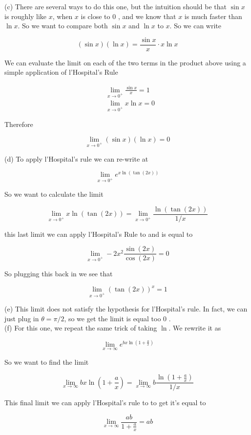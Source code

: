 \documentclass[10pt]{article}
\begin{document}
(c) There are several ways to do this one, but the intuition should be that $\sin x$ is roughly like $x$, when $x$ is close to 0 , and we know that $x$ is much faster than $\ln x$. So we want to compare both $\sin x$ and $\ln x$ to $x$. So we can write

$$
(\sin x)(\ln x)=\frac{\sin x}{x} \cdot x \ln x
$$

We can evaluate the limit on each of the two terms in the product above using a simple application of l'Hospital's Rule

$$
\begin{aligned}
& \lim _{x \rightarrow 0^{+}} \frac{\sin x}{x}=1 \\
& \lim _{x \rightarrow 0^{+}} x \ln x=0
\end{aligned}
$$

Therefore

$$
\lim _{x \rightarrow 0^{+}}(\sin x)(\ln x)=0
$$

(d) To apply l'Hospital's rule we can re-write at

$$
\lim _{x \rightarrow 0^{+}} e^{x \ln (\tan (2 x))}
$$

So we want to calculate the limit

$$
\lim _{x \rightarrow 0^{+}} x \ln (\tan (2 x))=\lim _{x \rightarrow 0^{+}} \frac{\ln (\tan (2 x))}{1 / x}
$$

this last limit we can apply l'Hospital's Rule to and is equal to

$$
\lim _{x \rightarrow 0^{+}}-2 x^{2} \frac{\sin (2 x)}{\cos (2 x)}=0
$$

So plugging this back in we see that

$$
\lim _{x \rightarrow 0^{+}}(\tan (2 x))^{x}=1
$$

(e) This limit does not satisfy the hypothesis for l'Hospital's rule. In fact, we can just plug in $\theta=\pi / 2$, so we get the limit is equal too 0 .\\
(f) For this one, we repeat the same trick of taking $\ln$. We rewrite it as

$$
\lim _{x \rightarrow \infty} e^{b x \ln \left(1+\frac{a}{x}\right)}
$$

So we want to find the limit

$$
\lim _{x \rightarrow \infty} b x \ln \left(1+\frac{a}{x}\right)=\lim _{x \rightarrow \infty} b \frac{\ln \left(1+\frac{a}{x}\right)}{1 / x}
$$

This final limit we can apply l'Hospital's rule to to get it's equal to

$$
\lim _{x \rightarrow \infty} \frac{a b}{1+\frac{a}{x}}=a b
$$
\end{document}
